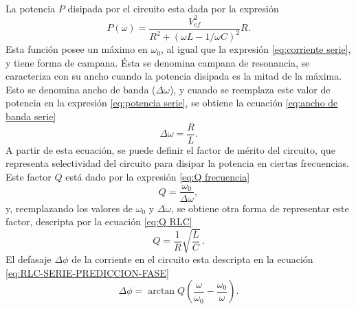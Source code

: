 \paragraph{}
La potencia $P$ disipada por el circuito esta dada por la expresión \cite{apunte_guia3}
\begin{equation}\label{eq:potencia serie}
    P(\omega)=\frac{V_{ef}^2}{R^2+(\omega L-1/\omega C)^2}R.
\end{equation}
Esta función posee un máximo en $\omega_0$, al igual que la expresión \eqref{eq:corriente serie}, y tiene forma de campana. Ésta se denomina campana de resonancia, se caracteriza con su ancho cuando la potencia disipada es la mitad de la máxima. Esto se denomina ancho de banda ($\Delta \omega$), y cuando se reemplaza este valor de potencia en la expresión \eqref{eq:potencia serie}, se obtiene la ecuación \ref{eq:ancho de banda serie} \cite{apunte_guia3}
\begin{equation}\label{eq:ancho de banda serie}
    \Delta \omega=\frac{R}{L}.
\end{equation}
A partir de esta ecuación, se puede definir el factor de mérito del circuito, que representa selectividad del circuito para disipar la potencia en ciertas frecuencias. Este factor $Q$ está dado por la expresión \eqref{eq:Q frecuencia} \cite{apunte_guia3}
\begin{equation}\label{eq:Q frecuencia}
    Q=\frac{\omega_0}{\Delta \omega},
\end{equation}
y, reemplazando los valores de $\omega_0$ y $\Delta \omega$, se obtiene otra forma de representar este factor, descripta por la ecuación \eqref{eq:Q RLC} 
\begin{equation}\label{eq:Q RLC}
    Q=\frac{1}{R}\sqrt{\frac{L}{C}}\, .
\end{equation}
El defasaje $\Delta \phi$ de la corriente en el circuito esta descripta en la ecuación \eqref{eq:RLC-SERIE-PREDICCION-FASE}
\begin{equation}\label{eq:RLC-SERIE-PREDICCION-FASE}
    \Delta \phi = \arctan Q (\frac{\omega}{\omega_0}-\frac{\omega_0}{\omega}).
\end{equation}
